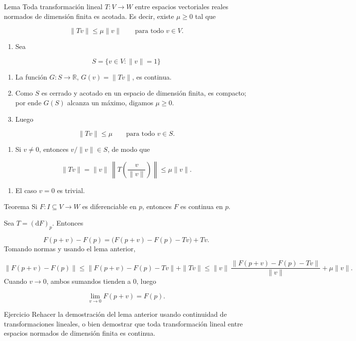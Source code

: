 \begin{booklemma}{Lema}
Toda transformación lineal $T \colon V \to W$ entre espacios vectoriales reales normados de dimensión finita es acotada. Es decir, existe $\mu \ge 0$ tal que

\[
\|Tv\|\le \mu \|v\|
\qquad \text{para todo } v \in V.
\]
\end{booklemma}
\begin{bookproof}{}
\begin{enumerate}
\item Sea
\end{enumerate}
\[
S=\{v\in V:\|v\|=1\}
\]
\begin{enumerate}[start=2]
\item La función $G \colon S \to \mathbb{R}$, $G(v)=\|Tv\|$, es continua.
\item Como $S$ es cerrado y acotado en un espacio de dimensión finita, es compacto; por ende $G(S)$ alcanza un máximo, digamos $\mu\ge 0$.
\item Luego
\end{enumerate}
\[
\|Tv\|\le \mu\qquad \text{para todo } v\in S.
\]
\begin{enumerate}[start=5]
\item Si $v\neq 0$, entonces $v/\|v\|\in S$, de modo que
\end{enumerate}
\[
\|Tv\|=\|v\|\,\left\|T\!\left(\frac{v}{\|v\|}\right)\right\|\le\mu \|v\|.
\]
\begin{enumerate}[start=6]
\item El caso $v=0$ es trivial.
\end{enumerate}
\bookqed
\end{bookproof}
\begin{booktheorem}{Teorema}
Si $F \colon I \subseteq V \to W$ es diferenciable en $p$, entonces $F$ es continua en $p$.

\end{booktheorem}
\begin{bookproof}{}
Sea $T=(\mathrm{d}F)_p$. Entonces

\[
F(p+v)-F(p)=\bigl(F(p+v)-F(p)-Tv\bigr)+Tv.
\]
Tomando normas y usando el lema anterior,

\[
\|F(p+v)-F(p)\|
\le
\|F(p+v)-F(p)-Tv\|+\|Tv\|
\le
\|v\|\,\frac{\|F(p+v)-F(p)-Tv\|}{\|v\|}+\mu \|v\|.
\]
Cuando $v\to 0$, ambos sumandos tienden a $0$, luego

\[
\lim_{v\to 0} F(p+v)=F(p).
\]
\bookqed
\end{bookproof}
\begin{bookexercise}{Ejercicio}
Rehacer la demostración del lema anterior usando continuidad de transformaciones lineales, o bien demostrar que toda transformación lineal entre espacios normados de dimensión finita es continua.

\end{bookexercise}
